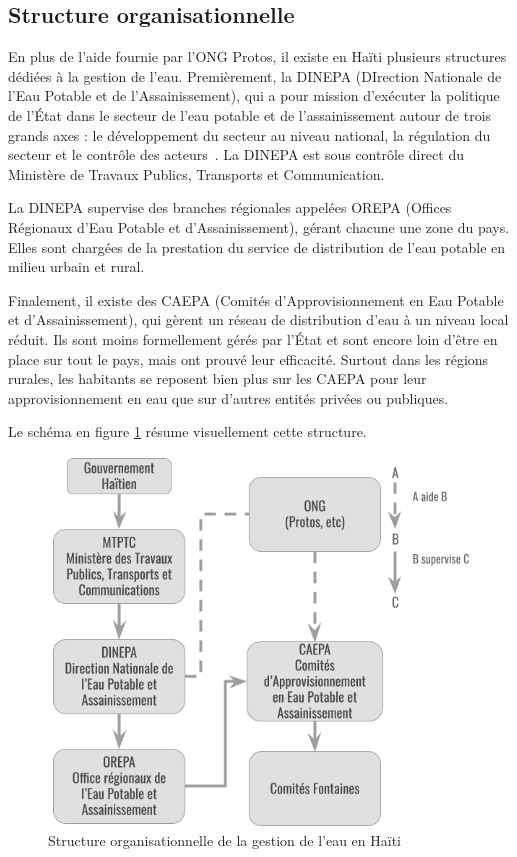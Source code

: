 \documentclass{EPL-master-thesis-covers-FR}
\begin{document}
			\subsection*{Structure organisationnelle}
				\label{sec:structure_haiti}

				En plus de l'aide fournie par l'ONG Protos, il existe en Haïti plusieurs structures dédiées à la gestion de l'eau. Premièrement, la DINEPA (DIrection Nationale de l'Eau Potable et de l'Assainissement), qui a pour mission d’exécuter la politique de l’\'Etat dans le secteur de l’eau potable et de l’assainissement autour de trois grands axes : le développement du secteur au niveau national, la régulation du secteur et le contrôle des acteurs~\cite{ref:dinepa}. La DINEPA est sous contrôle direct du Ministère de Travaux Publics, Transports et Communication.

				La DINEPA supervise des branches régionales appelées OREPA (Offices Régionaux d'Eau Potable et d'Assainissement), gérant chacune une zone du pays. Elles sont chargées de la prestation du service de distribution de l'eau potable en milieu urbain et rural.

				Finalement, il existe des CAEPA (Comités d’Approvisionnement en Eau Potable et d'Assainissement), qui gèrent un réseau de distribution d'eau à un niveau local réduit. Ils sont moins formellement gérés par l'\'Etat et sont encore loin d'être en place sur tout le pays, mais ont prouvé leur efficacité. Surtout dans les régions rurales, les habitants se reposent bien plus sur les CAEPA pour leur approvisionnement en eau que sur d'autres entités privées ou publiques.

				Le schéma en figure \ref{fig:organisation} résume visuellement cette structure.

				\begin{figure}[H]
					\begin{center}
						\includegraphics[width=\textwidth/2]{images/organisation}
						\caption{Structure organisationnelle de la gestion de l'eau en Haïti}
						\label{fig:organisation}
					\end{center}
				\end{figure}
\end{document}
